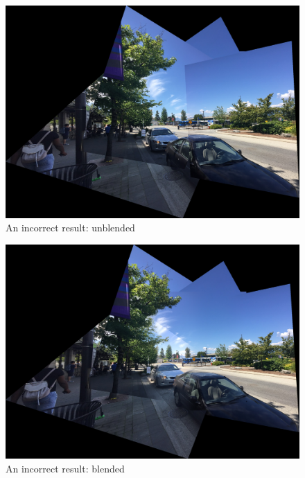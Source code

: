 \documentclass[]{article}
\begin{document}
\begin{figure}[!h]
	\includegraphics[scale=0.2]{results/p2_noblend/16}
	\centering
	\caption{An incorrect result: unblended}
\end{figure}
\begin{figure}[!h]
	\includegraphics[scale=0.192]{results/p2_blend/16}
	\centering
	\caption{An incorrect result: blended}
\end{figure}
\end{document}
